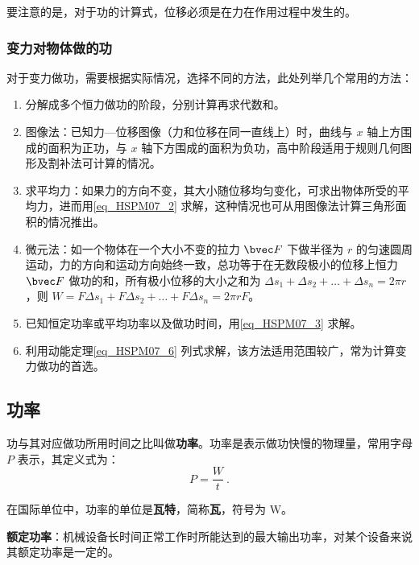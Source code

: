 要注意的是，对于功的计算式，位移必须是在力在作用过程中发生的。

\subsubsection{变力对物体做的功}

对于变力做功，需要根据实际情况，选择不同的方法，此处列举几个常用的方法：

\begin{enumerate}
\item 分解成多个恒力做功的阶段，分别计算再求代数和。

\item 图像法：已知力—位移图像（力和位移在同一直线上）时，曲线与 $x$ 轴上方围成的面积为正功，与 $x$ 轴下方围成的面积为负功，高中阶段适用于规则几何图形及割补法可计算的情况。

\item 求平均力：如果力的方向不变，其大小随位移均匀变化，可求出物体所受的平均力，进而用\autoref{eq_HSPM07_2} 求解，这种情况也可从用图像法计算三角形面积的情况推出。

\item 微元法：如一个物体在一个大小不变的拉力 $\bvec F$ 下做半径为 $r$ 的匀速圆周运动，力的方向和运动方向始终一致，总功等于在无数段极小的位移上恒力 $\bvec F$ 做功的和，所有极小位移的大小之和为 $\Delta s_1+\Delta s_2+\dots+\Delta s_n=2\pi r$，则 $W=F\Delta s_1+F\Delta s_2+\dots+F\Delta s_n=2\pi rF$。

\item 已知恒定功率或平均功率以及做功时间，用\autoref{eq_HSPM07_3} 求解。

\item 利用动能定理\autoref{eq_HSPM07_6} 列式求解，该方法适用范围较广，常为计算变力做功的首选。
\end{enumerate}

\subsection{功率}

功与其对应做功所用时间之比叫做\textbf{功率}。功率是表示做功快慢的物理量，常用字母 $P$ 表示，其定义式为：
\begin{equation}\label{eq_HSPM07_3}
P=\frac{W}{t}~.
\end{equation}

在国际单位中，功率的单位是\textbf{瓦特}，简称\textbf{瓦}，符号为 $\mathrm{W}$。

\textbf{额定功率}：机械设备长时间正常工作时所能达到的最大输出功率，对某个设备来说其额定功率是一定的。

